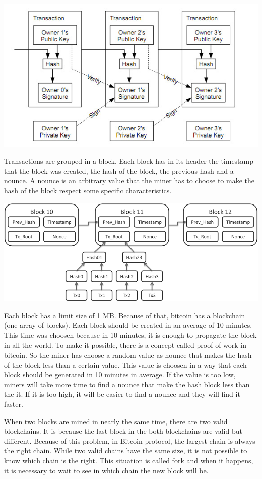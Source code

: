 \documentclass[12pt]{article}
\begin{document}
\includegraphics[width=\columnwidth]{imgs/transactions2.jpg}

Transactions are grouped in a block.
Each block has in its header the timestamp that the block was created, the hash of the block,
the previous hash and a nounce.
A nounce is an arbitrary value that the miner has to choose to make the hash of the block respect some specific characteristics.

\includegraphics[width=\columnwidth]{imgs/blockchain.png}

Each block has a limit size of 1 MB.
Because of that, bitcoin has a blockchain (one array of blocks).
Each block should be created in an average of 10 minutes.
This time was choosen because in 10 minutes, it is enough to propagate the block in all the world.
To make it possible, there is a concept called proof of work in bitcoin.
So the miner has choose a random value as nounce that makes the hash of the block less than a certain value.
This value is choosen in a way that each block should be generated in 10 minutes in average.
If the value is too low, miners will take more time to find a nounce that make the hash block less than the it.
If it is too high, it will be easier to find a nounce and they will find it faster.

When two blocks are mined in nearly the same time, there are two valid blockchains.
It is because the last block in the both blockchains are valid but different.
Because of this problem, in Bitcoin protocol, the largest chain is always the right chain.
While two valid chains have the same size, it is not possible to know which chain is the right.
This situation is called fork and when it happens, it is necessary to wait to see in which chain the new block will be.
\end{document}
